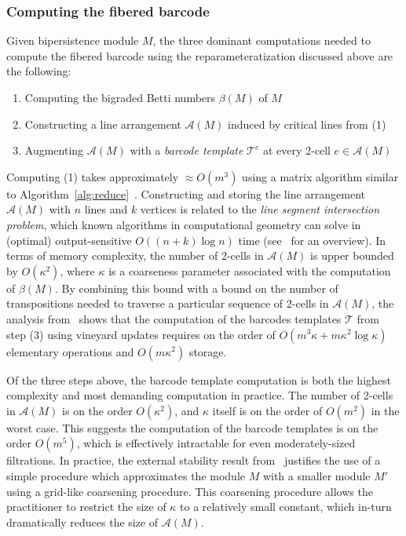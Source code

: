 \documentclass{siamart190516}
\newcommand\sbullet[1][.5]{\mathbin{\vcenter{\hbox{\scalebox{#1}{$\bullet$}}}}}
\begin{document}
\subsubsection*{Computing the fibered barcode}
Given bipersistence module $M$, the three dominant computations needed to compute the fibered barcode using the reparameteratization discussed above are the following: 
\begin{enumerate}
	\item Computing the bigraded Betti numbers $\beta(M)$ of $M$
	\item Constructing a line arrangement $\mathcal{A}(M)$ induced by critical lines from (1) 
	\item Augmenting $\mathcal{A}(M)$ with a \emph{barcode template} $\mathcal{T}^e$ at every 2-cell $e \in \mathcal{A}(M)$
\end{enumerate}
Computing (1) takes approximately $\approx O(m^3)$ using a matrix algorithm similar to Algorithm~\ref{alg:reduce}~\cite{lesnick2019computing}. Constructing and storing the line arrangement $\mathcal{A}(M)$ with $n$ lines and $k$ vertices is related to the \emph{line segment intersection problem}, which known algorithms in computational geometry can solve in (optimal) output-sensitive $O((n+k) \log n)$ time (see~\cite{boissonnat2000robust} for an overview). In terms of memory complexity, the number of 2-cells in $\mathcal{A}(M)$ is upper bounded by $O(\kappa^2)$, where $\kappa$ is a coarseness parameter associated with the computation of $\beta(M)$. 
By combining this bound with a bound on the number of transpositions needed to traverse a particular sequence of 2-cells in $\mathcal{A}(M)$, the analysis from~\cite{lesnick2015interactive} shows that the computation of the barcodes templates $\mathcal{T}$ from step (3) using vineyard updates requires on the order of $O(m^3 \kappa + m \kappa^2 \log \kappa)$ elementary operations and $O(m \kappa^2)$ storage. 

Of the three steps above, the barcode template computation is both the highest complexity and most demanding computation in practice. The number of 2-cells in $\mathcal{A}(M)$ is on the order $O(\kappa^2)$, and $\kappa$ itself is on the order of $O(m^2)$ in the worst case. 
This suggests the computation of the barcode templates is on the order $O(m^5)$, which is effectively intractable for even moderately-sized filtrations. In practice, the external stability result from~\cite{landi2014rank} justifies the use of a simple procedure which approximates the module $M$ with a smaller module $M'$ using a grid-like coarsening procedure. This coarsening procedure allows the practitioner to restrict the size of $\kappa$ to a relatively small constant, which in-turn dramatically reduces the size of $\mathcal{A}(M)$. 
\end{document}
